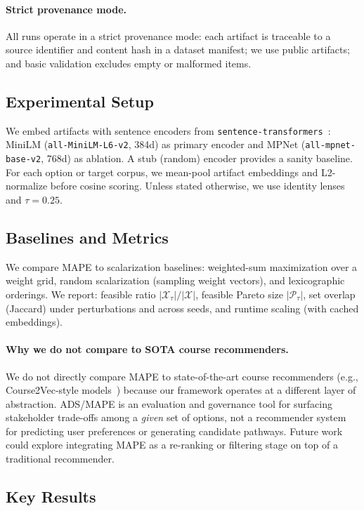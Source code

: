 \documentclass[sigconf,review]{acmart}
\newcommand{\ADS}{\textsc{ADS}\xspace}
\newcommand{\MAPE}{\textsc{MAPE}\xspace}
\begin{document}
\paragraph{Strict provenance mode.}
All runs operate in a strict provenance mode: each artifact is traceable to a source identifier and content hash in a dataset manifest; we use public artifacts; and basic validation excludes empty or malformed items.

\subsection{Experimental Setup}
We embed artifacts with sentence encoders from \texttt{sentence-transformers}~\cite{reimers2019sentencebert}: MiniLM (\texttt{all-MiniLM-L6-v2}, 384d) as primary encoder and MPNet (\texttt{all-mpnet-base-v2}, 768d) as ablation. A stub (random) encoder provides a sanity baseline. For each option or target corpus, we mean-pool artifact embeddings and L2-normalize before cosine scoring. Unless stated otherwise, we use identity lenses and $\tau{=}0.25$.

\subsection{Baselines and Metrics}
We compare \MAPE to scalarization baselines: weighted-sum maximization over a weight grid, random scalarization (sampling weight vectors), and lexicographic orderings. We report: feasible ratio $|\mathcal{X}_\tau|/|\mathcal{X}|$, feasible Pareto size $|\mathcal{P}_\tau|$, set overlap (Jaccard) under perturbations and across seeds, and runtime scaling (with cached embeddings).

\paragraph{Why we do not compare to SOTA course recommenders.}
We do not directly compare \MAPE to state-of-the-art course recommenders (e.g., Course2Vec-style models~\cite{morsy2019course2vec}) because our framework operates at a different layer of abstraction. \ADS/\MAPE is an evaluation and governance tool for surfacing stakeholder trade-offs among a \emph{given} set of options, not a recommender system for predicting user preferences or generating candidate pathways. Future work could explore integrating \MAPE as a re-ranking or filtering stage on top of a traditional recommender.

\subsection{Key Results}
\end{document}
